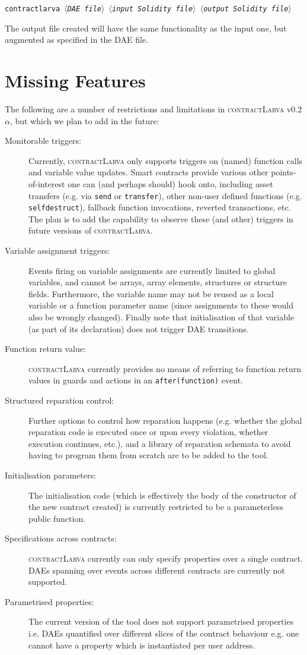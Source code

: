 \documentclass{article}
\newcommand{\contractlarva}{\textsc{contractLarva}\xspace}
\newcommand{\keyword}[1]{\textit{$\langle$#1$\rangle$}}
\begin{document}
  \smallskip\centerline{\texttt{contractlarva \keyword{DAE file} \keyword{input Solidity file} \keyword{output Solidity file}}}
  
  \smallskip The output file created will have the same functionality as the input one, but augmented as specified in the DAE file.
  
  \section{Missing Features}
  \label{s:extensions}
  The following are a number of restrictions and limitations in \contractlarva v0.2$\alpha$, but which we plan to add in the future:
  
  \begin{description}
    \item[Monitorable triggers:] Currently, \contractlarva only supports triggers on (named) function calls and variable value updates. Smart contracts provide various other points-of-interest one can (and perhaps should) hook onto, including asset transfers (e.g. via \texttt{send} or \texttt{transfer}), other non-user defined functions (e.g. \texttt{selfdestruct}), fallback function invocations, reverted transactions, etc. The plan is to add the capability to observe these (and other) triggers in future versions of \contractlarva.   
    \item[Variable assignment triggers:] Events firing on variable assignments are currently limited to global variables, and cannot be arrays, array elements, structures or structure fields. Furthermore, the variable name may not be reused as a local variable or a function parameter name (since assignments to these would also be wrongly changed). Finally note that initialisation of that variable (as part of its declaration) does not trigger DAE transitions.
    \item[Function return value:] \contractlarva currently provides no means of referring to function return values in guards and actions in an \texttt{after(function)} event.
    \item[Structured reparation control:] Further options to control how reparation happens (e.g. whether the global reparation code is executed once or upon every violation, whether execution continues, etc.), and a library of reparation schemata to avoid having to program them from scratch are to be added to the tool. 
    \item[Initialisation parameters:] The initialisation code (which is effectively the body of the constructor of the new contract created) is currently restricted to be a parameterless public function.
    \item[Specifications across contracts:] \contractlarva currently can only specify properties over a single contract. DAEs spanning over events across different contracts are currently not supported. 
    \item[Parametrised properties:] The current version of the tool does not support parametrised properties i.e. DAEs quantified over different slices of the contract behaviour e.g. one cannot have a property which is instantiated per user address. 
  \end{description}
  
\end{document}
